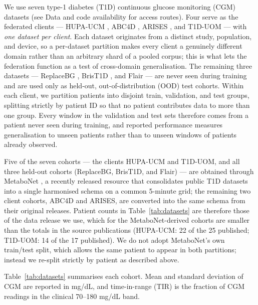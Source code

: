 \documentclass[10pt,letterpaper]{article}
\begin{document}
We use seven type-1 diabetes (T1D) continuous glucose
monitoring (CGM) datasets (see Data and code availability for access routes). Four serve as the federated clients --- HUPA-UCM
\cite{hidalgo2024hupaucm}, ABC4D \cite{abc4d_nct}, ARISES \cite{zhu2022arises},
and T1D-UOM \cite{alsuhaymi2025t1duom} --- with \emph{one dataset per client}. Each dataset
originates from a distinct study, population, and device, so a per-dataset
partition makes every client a genuinely different domain rather than an
arbitrary shard of a pooled corpus; this is what lets the federation function as
a test of cross-domain generalisation. The remaining three datasets ---
ReplaceBG \cite{aleppo2017replacebg}, BrisT1D \cite{james2025brist1d}, and Flair
\cite{jaeb_flair} --- are never seen
during training and are used only as held-out, out-of-distribution (OOD) test
cohorts. Within
each client, we partition patients
into disjoint train, validation, and test groups, splitting strictly by
patient ID so that no patient contributes data to more than one group. Every
window in the validation and test sets therefore comes from a patient never
seen during training, and reported performance measures generalisation to
unseen patients rather than to unseen windows of patients already observed.

Five of the seven cohorts --- the clients HUPA-UCM and T1D-UOM, and all three
held-out cohorts (ReplaceBG, BrisT1D, and Flair) --- are obtained through
MetaboNet \cite{wolff2026metabonet}, a
recently released resource that consolidates public T1D datasets into a single
harmonised schema on a common 5-minute grid; the remaining two client cohorts,
ABC4D and ARISES, are converted
into the same schema from their original releases. Patient counts in
Table~\ref{tab:datasets} are therefore those of the data release we use, which
for the MetaboNet-derived cohorts are smaller than the totals in the source
publications (HUPA-UCM: 22 of the 25 published; T1D-UOM: 14 of the 17
published). We do not adopt MetaboNet's own train/test split, which allows the
same patient to appear in both partitions; instead we re-split strictly by
patient as described above.

Table~\ref{tab:datasets} summarises each cohort. Mean and standard deviation of
CGM are reported in mg/dL, and time-in-range (TIR) is the fraction of CGM
readings in the clinical 70--180 mg/dL band.
\end{document}
